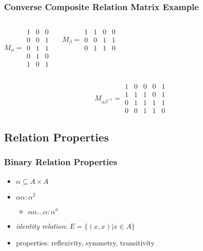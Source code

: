 \documentclass[dvipsnames]{beamer}
\begin{document}
\begin{frame}
  \frametitle{Converse Composite Relation Matrix Example}

  \begin{example}
    \begin{columns}
      \[ M_\alpha =
        \begin{array}{|ccc|}
          1 & 0 & 0\\
          0 & 0 & 1\\
          0 & 1 & 1\\
          0 & 1 & 0\\
          1 & 0 & 1
        \end{array}
      \]

      \[ M_\beta =
        \begin{array}{|cccc|}
          1 & 1 & 0 & 0\\
          0 & 0 & 1 & 1\\
          0 & 1 & 1 & 0
        \end{array}
      \]
    \end{columns}

    \[ M_{\alpha \beta^{-1}} =
      \begin{array}{|ccccc|}
        1 & 0 & 0 & 0 & 1\\
        1 & 1 & 1 & 0 & 1\\
        0 & 1 & 1 & 1 & 1\\
        0 & 0 & 1 & 1 & 0
      \end{array}
    \]
  \end{example}
\end{frame}

\subsection{Relation Properties}

\begin{frame}
  \frametitle{Binary Relation Properties}

  \begin{itemize}
    \item $\alpha \subseteq A \times A$

    \pause
    \medskip
    \item $\alpha \alpha: \alpha^2$
    \begin{itemize}
      \item $\alpha \alpha \dots \alpha: \alpha^n$
    \end{itemize}

    \pause
    \medskip
    \item \emph{identity relation}: $E = \{(x,x) | x \in A\}$

    \pause
    \medskip
    \item properties: reflexivity, symmetry, transitivity
  \end{itemize}
\end{frame}
\end{document}
